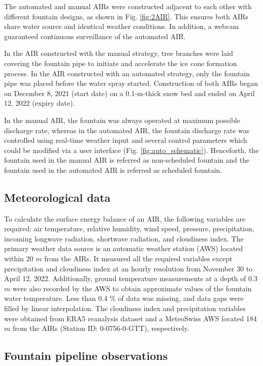 \documentclass[tc, manuscript]{copernicus}
\begin{document}
The automated and manual AIRs were constructed adjacent to each other with different fountain
designs, as shown in Fig. \ref{fig:2AIR}. This ensures both AIRs share water source and identical
weather conditions. In addition, a webcam guaranteed continuous surveillance of the automated AIR.   

In the AIR constructed with the manual strategy, tree branches were laid covering the fountain pipe to
initiate and accelerate the ice cone formation process. In the AIR constructed with an automated strategy, only
the fountain pipe was placed before the water spray started. Construction of both AIRs began on December 8, 2021
(start date) on a 0.1-m-thick snow bed and ended on April 12, 2022 (expiry date).

In the manual AIR, the fountain was always operated at maximum possible discharge rate, whereas in the automated
AIR, the fountain discharge rate was controlled using real-time weather input and several control parameters
which could be modified via a user interface (Fig. \ref{fig:auto_schematic}). Henceforth, the fountain used in
the manual AIR is referred as non-scheduled fountain and the fountain used in the automated AIR is referred as
scheduled fountain.

\subsection{Meteorological data}

To calculate the surface energy balance of an AIR, the following variables are required: air temperature,
relative humidity, wind speed, pressure, precipitation, incoming longwave radiation, shortwave radiation, and
cloudiness index. The primary weather data source is an automatic weather station (AWS) located within 20 $m$
from the AIRs. It measured all the required variables except precipitation and cloudiness index at an hourly
resolution from November 30 to April 12, 2022. Additionally, ground temperature measurements at a depth of 0.3 $m$
were also recorded by the AWS to obtain approximate values of the fountain water temperature. Less than 0.4 \%
of data was missing, and data gaps were filled by linear interpolation. The cloudiness index and precipitation
variables were obtained from ERA5 reanalysis dataset \citep{hersbachERA5GlobalReanalysis2020} and a MeteoSwiss
AWS located 184 $m$ from the AIRs (Station ID: 0-0756-0-GTT), respectively.


\subsection{Fountain pipeline observations}
\end{document}

